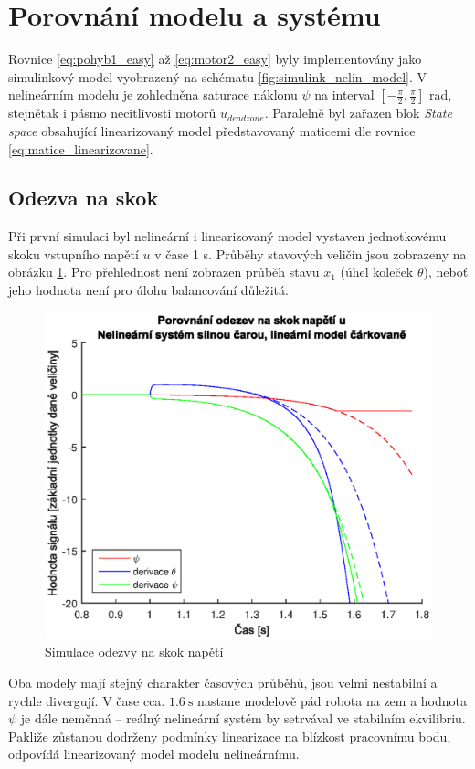 \documentclass[conference]{IEEEtran}
\begin{document}
\section{Porovnání modelu a systému}

Rovnice \eqref{eq:pohyb1_easy} až \eqref{eq:motor2_easy} byly implementovány jako simulinkový model vyobrazený na schématu \ref{fig:simulink_nelin_model}.
V nelineárním modelu je zohledněna saturace náklonu $\psi$ na interval $[-\frac{\pi}{2}, \frac{\pi}{2}]$ rad, stejnětak i pásmo necitlivosti motorů $u_{deadzone}$.
Paralelně byl zařazen blok \textit{State space} obsahující linearizovaný model představovaný maticemi dle rovnice \eqref{eq:matice_linearizovane}.
\subsection{Odezva na skok}
Při první simulaci byl nelineární i linearizovaný model
vystaven jednotkovému skoku vstupního napětí $u$ v čase 1 \si{\second}. Průběhy stavových veličin jsou zobrazeny na obrázku \ref{fig:porovnani_skok}.
Pro přehlednost není zobrazen průběh stavu $x_1$ (úhel koleček $\theta$), neboť jeho hodnota není pro úlohu balancování důležitá.
\begin{figure}[htbp]
    \centerline{\includegraphics[width=\linewidth]{porovnani_skok.eps}}
    \caption{Simulace odezvy na skok napětí}
    \label{fig:porovnani_skok}        
\end{figure}
Oba modely mají stejný charakter časových průběhů, jsou velmi nestabilní a rychle divergují.
V čase cca. $1.6~\si{\second}$ nastane modelově pád robota na zem a hodnota $\psi$ je dále neměnná -- reálný nelineární systém by setrvával ve stabilním ekvilibriu.
Pakliže zůstanou dodrženy podmínky linearizace na blízkost pracovnímu bodu, odpovídá linearizovaný model modelu nelineárnímu.
\end{document}
